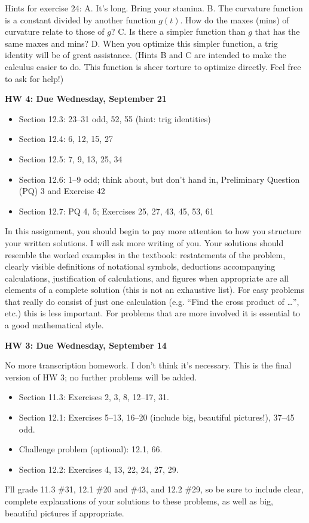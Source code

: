 \documentclass[10pt]{amsart}
\begin{document}
Hints for exercise 24: A. It's long. Bring your stamina. B. The curvature function is a constant divided by another function $g(t)$. How do the maxes (mins) of curvature relate to those of $g$? C. Is there a simpler function than $g$ that has the same maxes and mins? D. When you optimize this simpler function, a trig identity will be of great assistance. (Hints B and C are intended to make the calculus easier to do. This function is sheer torture to optimize directly. Feel free to ask for help!)
\begin{center}
\textbf{HW 4: Due Wednesday, September 21}
\end{center}
\begin{itemize}
    \item Section 12.3: 23--31 odd, 52, 55 (hint: trig identities)
    \item Section 12.4: 6, 12, 15, 27
    \item Section 12.5: 7, 9, 13, 25, 34
    \item Section 12.6: 1--9 odd; think about, but don't hand in, Preliminary Question (PQ) 3 and Exercise 42
    \item Section 12.7: PQ 4, 5; Exercises 25, 27, 43, 45, 53, 61
\end{itemize}
In this assignment, you should begin to pay more attention to how you structure your written solutions. I will ask more writing of you. Your solutions should resemble the worked examples in the textbook: restatements of the problem, clearly visible definitions of notational symbols, deductions accompanying calculations, justification of calculations, and figures when appropriate are all elements of a complete solution (this is not an exhaustive list). For easy problems that really do consist of just one calculation (e.g. ``Find the cross product of \dots'', etc.) this is less important. For problems that are more involved it is essential to a good mathematical style.

\begin{center}
\textbf{HW 3: Due Wednesday, September 14}
\end{center}
    No more transcription homework. I don't think it's necessary. This is the final version of HW 3; no further problems will be added.
\begin{itemize}
    \item Section 11.3: Exercises 2, 3, 8, 12--17, 31.
    \item Section 12.1: Exercises 5--13, 16--20 (include big, beautiful pictures!), 37--45 odd.
    \item Challenge problem (optional): 12.1, 66.
    \item Section 12.2: Exercises 4, 13, 22, 24, 27, 29.
\end{itemize}
I'll grade 11.3 \#31, 12.1 \#20 and \#43, and 12.2 \#29, so be sure to include clear, complete explanations of your solutions to these problems, as well as big, beautiful pictures if appropriate.
\end{document}

